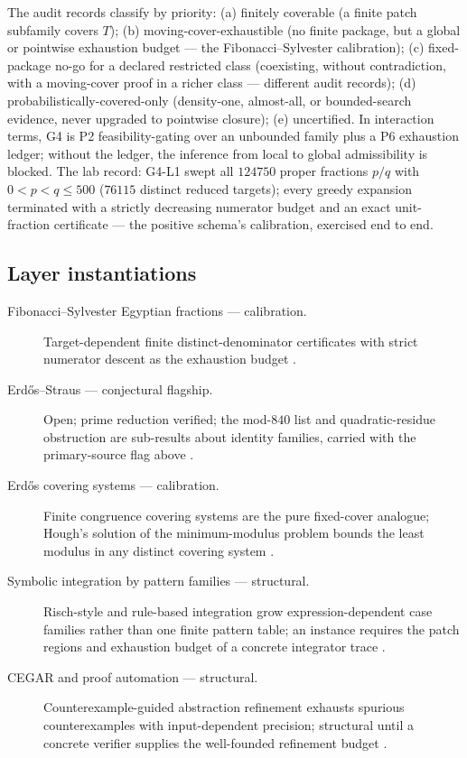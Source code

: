 \documentclass[11pt]{article}
\theoremstyle{definition}
\begin{document}
The audit records classify by priority: (a) finitely coverable (a finite patch subfamily covers
$T$); (b) moving-cover-exhaustible (no finite package, but a global or pointwise exhaustion budget
--- the Fibonacci--Sylvester calibration); (c) fixed-package no-go for a declared restricted class
(coexisting, without contradiction, with a moving-cover proof in a richer class --- different audit
records); (d) probabilistically-covered-only (density-one, almost-all, or bounded-search evidence,
never upgraded to pointwise closure); (e) uncertified. In interaction terms, G4 is P2
feasibility-gating over an unbounded family plus a P6 exhaustion ledger; without the ledger, the
inference from local to global admissibility is blocked. The lab record: G4-L1 swept all $124750$
proper fractions $p/q$ with $0 < p < q \le 500$ ($76115$ distinct reduced targets); every greedy
expansion terminated with a strictly decreasing numerator budget and an exact unit-fraction
certificate --- the positive schema's calibration, exercised end to end.

\subsection*{Layer instantiations}\label{layer-inst:G4}
\begin{description}
  \item[Fibonacci--Sylvester Egyptian fractions --- calibration.] Target-dependent finite
    distinct-denominator certificates with strict numerator descent as the exhaustion budget
    \citep{Fibonacci,Eppstein1995}.
  \item[Erd\H{o}s--Straus --- conjectural flagship.] Open; prime reduction verified; the mod-$840$
    list and quadratic-residue obstruction are sub-results about identity families, carried with the
    primary-source flag above \citep{Mordell1969,ElsholtzTao2013}.
  \item[Erd\H{o}s covering systems --- calibration.] Finite congruence covering systems are the pure
    fixed-cover analogue; Hough's solution of the minimum-modulus problem bounds the least modulus in
    any distinct covering system \citep{Hough2015}.
  \item[Symbolic integration by pattern families --- structural.] Risch-style and rule-based
    integration grow expression-dependent case families rather than one finite pattern table; an
    instance requires the patch regions and exhaustion budget of a concrete integrator trace
    \citep{Risch1969,Bronstein2005}.
  \item[CEGAR and proof automation --- structural.] Counterexample-guided abstraction refinement
    exhausts spurious counterexamples with input-dependent precision; structural until a concrete
    verifier supplies the well-founded refinement budget \citep{ClarkeEtAl2003}.
\end{description}
\end{document}
